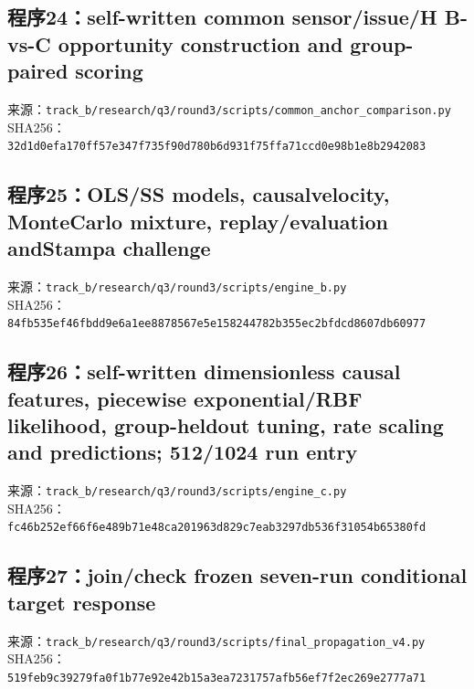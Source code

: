 \subsection*{程序24：self-written common sensor/issue/H B-vs-C opportunity construction and group-paired scoring}
\noindent 来源：\nolinkurl{track_b/research/q3/round3/scripts/common_anchor_comparison.py}\\
\noindent SHA256：\texttt{32d1d0efa170ff57e347f735f90d780b}\allowbreak\texttt{6d931f75ffa71ccd0e98b1e8b2942083}\\
\clearpage
\subsection*{程序25：OLS/SS models, causalvelocity, MonteCarlo mixture, replay/evaluation andStampa challenge}
\noindent 来源：\nolinkurl{track_b/research/q3/round3/scripts/engine_b.py}\\
\noindent SHA256：\texttt{84fb535ef46fbdd9e6a1ee8878567e5e}\allowbreak\texttt{158244782b355ec2bfdcd8607db60977}\\
\clearpage
\subsection*{程序26：self-written dimensionless causal features, piecewise exponential/RBF likelihood, group-heldout tuning, rate scaling and predictions; 512/1024 run entry}
\noindent 来源：\nolinkurl{track_b/research/q3/round3/scripts/engine_c.py}\\
\noindent SHA256：\texttt{fc46b252ef66f6e489b71e48ca201963}\allowbreak\texttt{d829c7eab3297db536f31054b65380fd}\\
\clearpage
\subsection*{程序27：join/check frozen seven-run conditional target response}
\noindent 来源：\nolinkurl{track_b/research/q3/round3/scripts/final_propagation_v4.py}\\
\noindent SHA256：\texttt{519feb9c39279fa0f1b77e92e42b15a3}\allowbreak\texttt{ea7231757afb56ef7f2ec269e2777a71}\\
\clearpage
